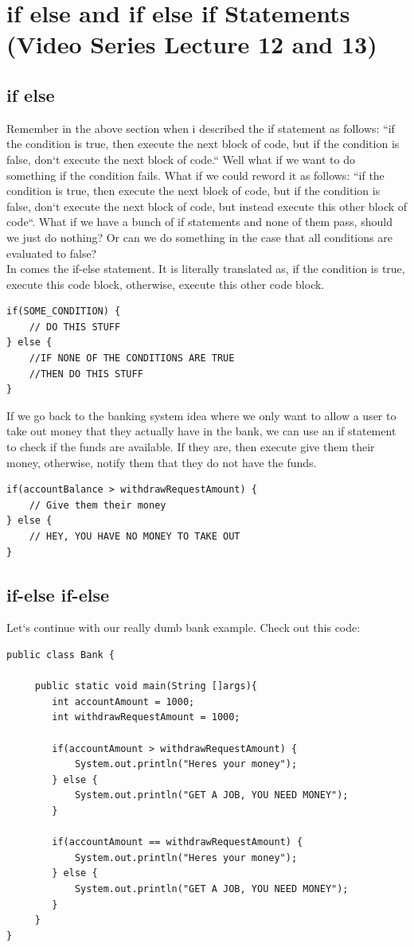 \documentclass[11]{article}
\begin{document}
\section{if else and if else if Statements (Video Series Lecture 12 and 13)}
\subsection{if else}
Remember in the above section when i described the if statement as follows: ``if the condition is true, then execute the next block of code, but if the condition is false, don`t execute the next block of code.`` Well what if we want to do something if the condition fails. What if we could reword it as follows: ``if the condition is true, then execute the next block of code, but if the condition is false, don`t execute the next block of code, but instead execute this other block of code``. What if we have a bunch of if statements and none of them pass, should we just do nothing? Or can we do something in the case that all conditions are evaluated to false?\\

In comes the if-else statement. It is literally translated as, if the condition is true, execute this code block, otherwise, execute this other code block.

\begin{lstlisting}
if(SOME_CONDITION) {
    // DO THIS STUFF
} else {
    //IF NONE OF THE CONDITIONS ARE TRUE
    //THEN DO THIS STUFF
}
\end{lstlisting}

If we go back to the banking system idea where we only want to allow a user to take out money that they actually have in the bank, we can use an if statement to check if the funds are available. If they are, then execute give them their money, otherwise, notify them that they do not have the funds.
\begin{lstlisting}
if(accountBalance > withdrawRequestAmount) {
    // Give them their money
} else {
	// HEY, YOU HAVE NO MONEY TO TAKE OUT
}
\end{lstlisting}

\subsection{if-else if-else}
Let`s continue with our really dumb bank example. Check out this code:

\begin{lstlisting}
public class Bank {

     public static void main(String []args){
        int accountAmount = 1000;
        int withdrawRequestAmount = 1000;
        
        if(accountAmount > withdrawRequestAmount) {
            System.out.println("Heres your money");
        } else {
            System.out.println("GET A JOB, YOU NEED MONEY");
        }
        
        if(accountAmount == withdrawRequestAmount) {
            System.out.println("Heres your money");
        } else {
            System.out.println("GET A JOB, YOU NEED MONEY");
        }
     }
}
\end{lstlisting}
\end{document}
